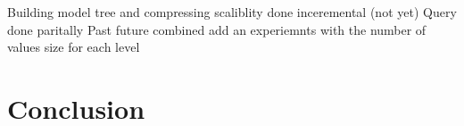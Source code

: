 \documentclass{sigmod}
\begin{document}








Building model tree and compressing
scaliblity done
inceremental (not yet)
Query done paritally
	Past 
	future
	combined
	add an experiemnts with the number of values size for each level	

\section{Conclusion}
\label{sec:conclusion}













\scriptsize
 
\end{document}
